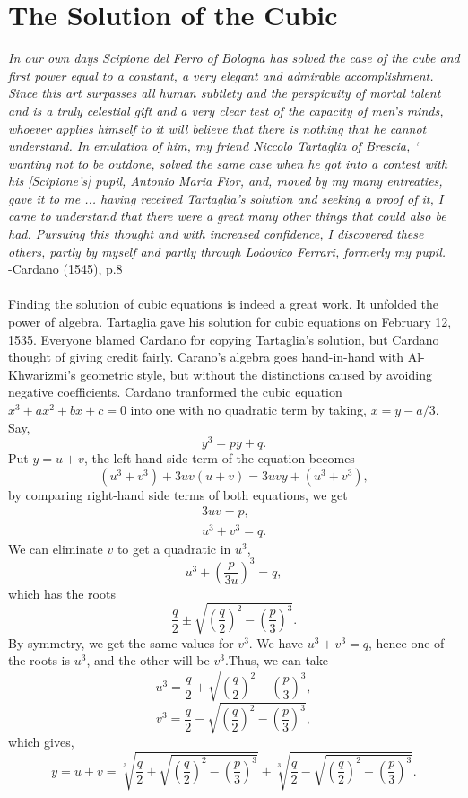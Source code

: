 \documentclass[a4paper,reqno,11pt]{amsart}
\theoremstyle{plain}%
\theoremstyle{definition}
\theoremstyle{remark}
\begin{document}
\section{The Solution of the Cubic}
\textit{In our own days Scipione del Ferro of Bologna has solved
the case of the cube and first power equal to a constant, a
very elegant and admirable accomplishment. Since this art
surpasses all human subtlety and the perspicuity of mortal
talent and is a truly celestial gift and a very clear test of the
capacity of men’s minds, whoever applies himself to it will
believe that there is nothing that he cannot understand. In
emulation of him, my friend Niccolo Tartaglia of Brescia, `
wanting not to be outdone, solved the same case when he got
into a contest with his [Scipione’s] pupil, Antonio Maria Fior,
and, moved by my many entreaties, gave it to me ... having
received Tartaglia’s solution and seeking a proof of it, I came
to understand that there were a great many other things that
could also be had. Pursuing this thought and with increased
confidence, I discovered these others, partly by myself and
partly through Lodovico Ferrari, formerly my pupil.}\cite{ref 2}\\
\vspace{2ex}
\hfill{-Cardano (1545), p.8}\\
\\
Finding the solution of cubic equations is indeed a great work. It unfolded the power of algebra. Tartaglia gave his solution for cubic equations on February 12, 1535. Everyone blamed Cardano for copying Tartaglia’s solution, but Cardano thought of giving credit fairly. Carano's algebra goes hand-in-hand with Al-Khwarizmi's geometric style, but without the distinctions caused by avoiding negative coefficients. Cardano tranformed the cubic equation $x^3+ax^2+bx+c = 0$ into one with no quadratic term by taking, $x = y - a/3.$ Say,\\
$$y^3 = py + q.$$
Put $y = u + v$, the left-hand side term of the equation becomes
$$(u^3 + v^3) + 3uv(u + v) = 3uvy + (u^3 + v^3),$$
by comparing right-hand side terms of both equations, we get
\begin{align*}
3uv = p,\\
u^3 + v^3 = q.
\end{align*}
We can eliminate $v$ to get a quadratic in $u^3$,\\
$$u^3 + \left(\frac{p}{3u}\right)^3 = q,$$
which has the roots\\
$$\frac{q}{2} \pm \sqrt{\left(\frac{q}{2}\right)^2 - \left(\frac{p}{3}\right)^3}.$$
By symmetry, we get the same values for $v^3$. We have $u^3 + v^3 = q$, hence
one of the roots is $u^3$, and the other will be $v^3$.Thus, we can take
$$u^3 = \frac{q}{2} + \sqrt{\left(\frac{q}{2}\right)^2 - \left(\frac{p}{3}\right)^3},$$
$$v^3 = \frac{q}{2} - \sqrt{\left(\frac{q}{2}\right)^2 - \left(\frac{p}{3}\right)^3},$$
which gives,\\
$$y = u+v = \sqrt[3]{\frac{q}{2} + \sqrt{\left(\frac{q}{2}\right)^2 - \left(\frac{p}{3}\right)^3}} + \sqrt[3]{\frac{q}{2} - \sqrt{\left(\frac{q}{2}\right)^2 - \left(\frac{p}{3}\right)^3}}.$$\\
\\
\end{document}
